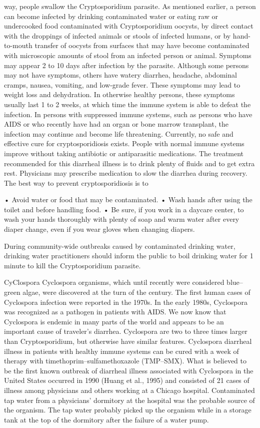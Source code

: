 \documentclass{article}
\begin{document}
way, people swallow the Cryptosporidium parasite. As mentioned earlier,
a person can become infected by drinking contaminated water or eating
raw or undercooked food contaminated with Cryptosporidium oocysts, by
direct contact with the droppings of infected animals or stools of
infected humans, or by hand-to-mouth transfer of oocysts from surfaces
that may have become contaminated with microscopic amounts of stool from
an infected person or animal. Symptoms may appear 2 to 10 days after
infection by the parasite. Although some persons may not have symptoms,
others have watery diarrhea, headache, abdominal cramps, nausea,
vomiting, and low-grade fever. These symptoms may lead to weight loss
and dehydration. In otherwise healthy persons, these symptoms usually
last 1 to 2 weeks, at which time the immune system is able to defeat the
infection. In persons with suppressed immune systems, such as persons
who have AIDS or who recently have had an organ or bone marrow
transplant, the infection may continue and become life threatening.
Currently, no safe and effective cure for cryptosporidiosis exists.
People with normal immune systems improve without taking antibiotic or
antiparasitic medications. The treatment recommended for this diarrheal
illness is to drink plenty of fluids and to get extra rest. Physicians
may prescribe medication to slow the diarrhea during recovery. The best
way to prevent cryptosporidiosis is to

• Avoid water or food that may be contaminated. • Wash hands after using
the toilet and before handling food. • Be sure, if you work in a daycare
center, to wash your hands thoroughly with plenty of soap and warm water
after every diaper change, even if you wear gloves when changing
diapers.

During community-wide outbreaks caused by contaminated drinking water,
drinking water practitioners should inform the public to boil drinking
water for 1 minute to kill the Cryptosporidium parasite.

CyClospora Cyclospora organisms, which until recently were considered
blue--green algae, were discovered at the turn of the century. The first
human cases of Cyclospora infection were reported in the 1970s. In the
early 1980s, Cyclospora was recognized as a pathogen in patients with
AIDS. We now know that Cyclospora is endemic in many parts of the world
and appears to be an important cause of traveler's diarrhea. Cyclospora
are two to three times larger than Cryptosporidium, but otherwise have
similar features. Cyclospora diarrheal illness in patients with healthy
immune systems can be cured with a week of therapy with
timethoprim--sulfamethoxazole (TMP--SMX). What is believed to be the
first known outbreak of diarrheal illness associated with Cyclospora in
the United States occurred in 1990 (Huang et al., 1995) and consisted of
21 cases of illness among physicians and others working at a Chicago
hospital. Contaminated tap water from a physicians' dormitory at the
hospital was the probable source of the organism. The tap water probably
picked up the organism while in a storage tank at the top of the
dormitory after the failure of a water pump.
\end{document}
